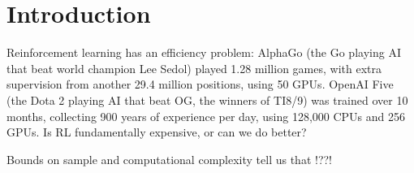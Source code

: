 \chapter{Introduction}\label{C:intro}

Reinforcement learning has an efficiency problem: AlphaGo \cite{Silver2016a} (the Go
playing AI that beat world champion Lee Sedol) played 1.28 million games, with
extra supervision from another 29.4 million positions, using 50 GPUs.
OpenAI Five \cite{OpenAI2018} (the Dota 2 playing AI that beat OG, the winners of TI8/9) was
trained over 10 months, collecting 900 years of experience per day, using
128,000 CPUs and 256 GPUs. Is RL fundamentally expensive, or can we do better?

Bounds on sample and computational complexity tell us that !??!


